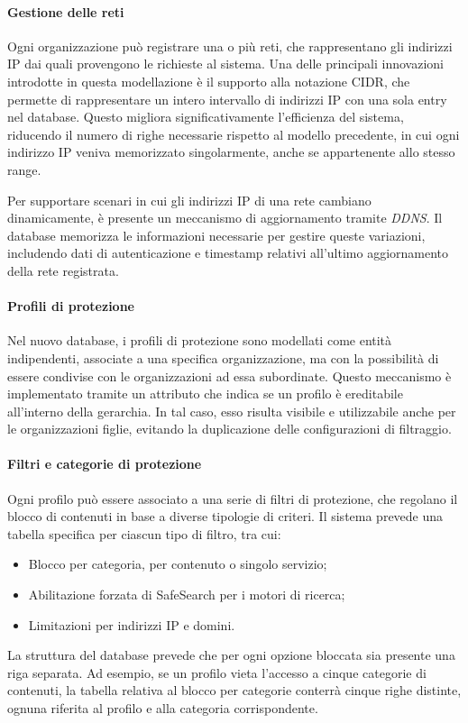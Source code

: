 \paragraph{Gestione delle reti}
Ogni organizzazione può registrare una o più reti, che rappresentano gli indirizzi IP dai quali provengono le richieste al sistema. Una delle principali innovazioni introdotte in questa modellazione è il supporto alla notazione CIDR, che permette di rappresentare un intero intervallo di indirizzi IP con una sola entry nel database. Questo migliora significativamente l’efficienza del sistema, riducendo il numero di righe necessarie rispetto al modello precedente, in cui ogni indirizzo IP veniva memorizzato singolarmente, anche se appartenente allo stesso range.

Per supportare scenari in cui gli indirizzi IP di una rete cambiano dinamicamente, è presente un meccanismo di aggiornamento tramite \emph{DDNS}. Il database memorizza le informazioni necessarie per gestire queste variazioni, includendo dati di autenticazione e timestamp relativi all’ultimo aggiornamento della rete registrata.

\paragraph{Profili di protezione}
Nel nuovo database, i profili di protezione sono modellati come entità indipendenti, associate a una specifica organizzazione, ma con la possibilità di essere condivise con le organizzazioni ad essa subordinate. Questo meccanismo è implementato tramite un attributo che indica se un profilo è ereditabile all'interno della gerarchia. In tal caso, esso risulta visibile e utilizzabile anche per le organizzazioni figlie, evitando la duplicazione delle configurazioni di filtraggio.

\paragraph{Filtri e categorie di protezione}
Ogni profilo può essere associato a una serie di filtri di protezione, che regolano il blocco di contenuti in base a diverse tipologie di criteri. Il sistema prevede una tabella specifica per ciascun tipo di filtro, tra cui:
\begin{itemize}
  \item Blocco per categoria, per contenuto o singolo servizio;
  \item Abilitazione forzata di SafeSearch per i motori di ricerca;
  \item Limitazioni per indirizzi IP e domini.
\end{itemize}
La struttura del database prevede che per ogni opzione bloccata sia presente una riga separata. Ad esempio, se un profilo vieta l’accesso a cinque categorie di contenuti, la tabella relativa al blocco per categorie conterrà cinque righe distinte, ognuna riferita al profilo e alla categoria corrispondente.

